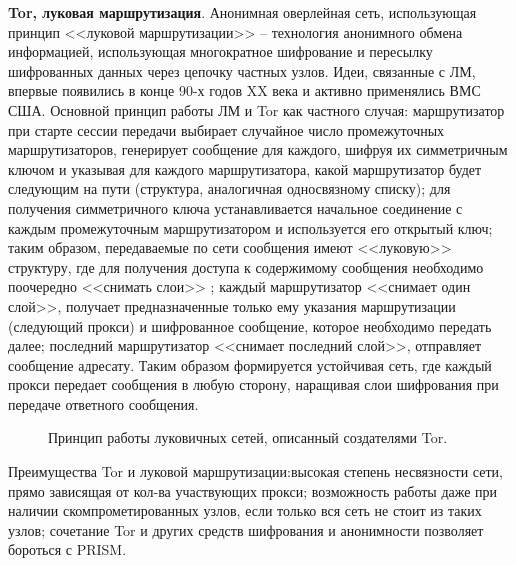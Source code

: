 \textbf{Tor, луковая маршрутизация}. Анонимная оверлейная сеть, использующая принцип <<луковой маршрутизации>> -- технология анонимного обмена информацией, использующая многократное шифрование и пересылку шифрованных данных через цепочку частных узлов. Идеи, связанные с ЛМ, впервые появились в конце 90-х годов XX века и активно применялись ВМС США. Основной принцип работы ЛМ и Tor как частного случая: маршрутизатор при старте сессии  передачи выбирает случайное число промежуточных маршрутизаторов, генерирует сообщение для каждого, шифруя их симметричным ключом и указывая для каждого маршрутизатора, какой маршрутизатор будет следующим на пути (структура, аналогичная односвязному списку); для получения симметричного ключа устанавливается начальное соединение с каждым промежуточным маршрутизатором и используется его открытый ключ; таким образом, передаваемые по сети сообщения имеют <<луковую>> структуру, где для получения доступа к содержимому сообщения необходимо поочередно <<снимать слои>> ; каждый маршрутизатор <<снимает один слой>>, получает предназначенные только ему указания маршрутизации (следующий прокси) и шифрованное сообщение, которое необходимо передать далее; последний маршрутизатор <<снимает последний слой>>, отправляет сообщение адресату. Таким образом формируется устойчивая сеть, где каждый прокси передает сообщения в любую сторону, наращивая слои шифрования при передаче ответного сообщения. \cite{TOR1} %
\begin{figure*}[h!]
	\caption{ Принцип работы луковичных сетей, описанный создателями Tor.}
\end{figure*} 

Преимущества Tor и луковой маршрутизации:высокая степень несвязности сети, прямо зависящая от кол-ва участвующих прокси; возможность работы даже при наличии скомпрометированных узлов, если только вся сеть не стоит из таких узлов; сочетание Tor и других средств шифрования и анонимности позволяет бороться с PRISM. \cite{TOR2} %



